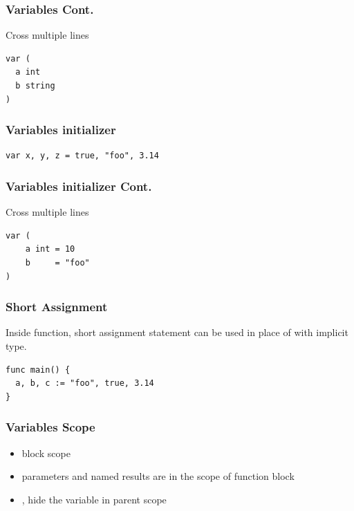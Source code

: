 \documentclass[xetex,mathserif,serif,12pt]{beamer}
\begin{document}
\begin{frame}[fragile]
  \frametitle{Variables Cont.}

  Cross multiple lines
  \newline

  \begin{beamer@nomargin}
    \begin{lstlisting}
var (
  a int
  b string
)
    \end{lstlisting}
  \end{beamer@nomargin}
\end{frame}

\begin{frame}[fragile]
  \frametitle{Variables initializer}

  \begin{beamer@nomargin}
    \begin{lstlisting}
var x, y, z = true, "foo", 3.14
    \end{lstlisting}
  \end{beamer@nomargin}
\end{frame}

\begin{frame}[fragile]
  \frametitle{Variables initializer Cont.}

  Cross multiple lines
  \newline

  \begin{beamer@nomargin}
    \begin{lstlisting}
var (
	a int = 10
	b     = "foo"
)
    \end{lstlisting}
  \end{beamer@nomargin}
\end{frame}

\begin{frame}[fragile]
  \frametitle{Short Assignment}

  \alert{Inside function}, \hltexttt{:=} short assignment statement can
  be used in place of  with implicit type.
  \newline

  \begin{beamer@nomargin}
    \begin{lstlisting}
func main() {
  a, b, c := "foo", true, 3.14
}
    \end{lstlisting}
  \end{beamer@nomargin}
\end{frame}

\begin{frame}
  \frametitle{Variables Scope}

  \begin{itemize}
  \item block scope
  \item parameters and named results are in the scope of function block
  \item {}, \hltexttt{:=} hide the variable in parent scope
  \end{itemize}
\end{frame}
\end{document}
